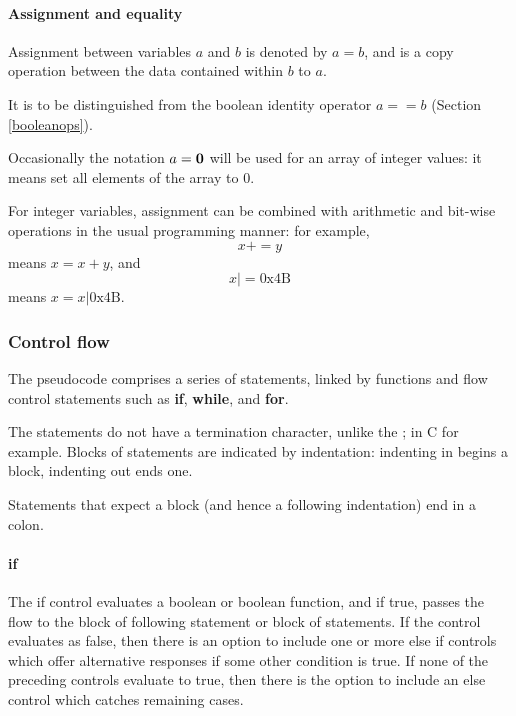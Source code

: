 \paragraph*{Assignment and equality\\}

Assignment between variables $a$ and $b$ is denoted by $a=b$, and is a copy
operation between the data contained within $b$ to $a$. 

It is to be distinguished from
the boolean identity operator $a==b$ (Section \ref{booleanops}).

Occasionally the notation $a={\bf 0}$ will be used for an array of integer values:
it means set all elements of the array to 0.

For integer variables, assignment can be combined with arithmetic and bit-wise
operations in the usual programming manner: for example, 
\[x+=y\]
means $x=x+y$, and
\[x |= \text{0x4B}\]
means $x=x|\text{0x4B}$.

\subsubsection{Control flow}
\label{controlflow}

The pseudocode comprises a series of statements, linked by functions and
flow control statements such as {\bf if}, {\bf while}, and {\bf for}.

The statements do not have a termination character, unlike the ; in C
for example.  Blocks of statements are indicated by indentation:
indenting in begins a block, indenting out ends one.

Statements that expect a block (and hence a following indentation) end
in a colon.

\paragraph*{if}

The if control evaluates a boolean or boolean function, and if true, passes the 
flow to the block of following statement or block of statements. If the control
evaluates as false, then there is an option to include one or more else if
controls which offer alternative responses if some other condition is
true.  If none of the preceding controls evaluate to true, then there is
the option to include an else control which catches remaining cases.

\begin{pseudo*}
\bsELSE
\bsEND
\end{pseudo*}

